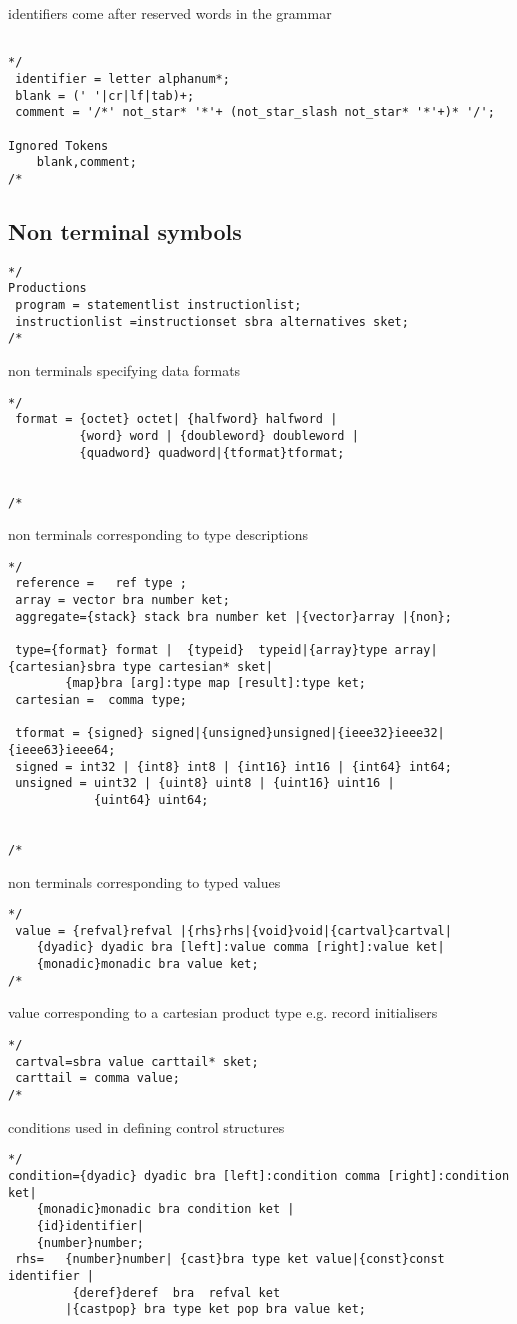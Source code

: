  identifiers come after reserved words in the grammar 
\begin{verbatim}

*/
 identifier = letter alphanum*;  
 blank = (' '|cr|lf|tab)+;
 comment = '/*' not_star* '*'+ (not_star_slash not_star* '*'+)* '/';

Ignored Tokens 
	blank,comment;
/*\end{verbatim}\subsection{Non terminal symbols}\begin{verbatim}
*/
Productions
 program = statementlist instructionlist;
 instructionlist =instructionset sbra alternatives sket;
/*\end{verbatim} non terminals specifying data formats \begin{verbatim}*/
 format = {octet} octet| {halfword} halfword |
          {word} word | {doubleword} doubleword |
          {quadword} quadword|{tformat}tformat;
 
 
/*\end{verbatim} non terminals corresponding to type descriptions \begin{verbatim}*/
 reference =   ref type ;
 array = vector bra number ket;
 aggregate={stack} stack bra number ket |{vector}array |{non};
 
 type={format} format |  {typeid}  typeid|{array}type array|{cartesian}sbra type cartesian* sket|
		{map}bra [arg]:type map [result]:type ket;
 cartesian =  comma type;
 
 tformat = {signed} signed|{unsigned}unsigned|{ieee32}ieee32|{ieee63}ieee64;
 signed = int32 | {int8} int8 | {int16} int16 | {int64} int64;
 unsigned = uint32 | {uint8} uint8 | {uint16} uint16 | 
            {uint64} uint64;
   

/*\end{verbatim} non terminals corresponding to typed values \begin{verbatim}*/
 value = {refval}refval |{rhs}rhs|{void}void|{cartval}cartval|
	{dyadic} dyadic bra [left]:value comma [right]:value ket|
	{monadic}monadic bra value ket;
/*\end{verbatim} value corresponding to a cartesian product type e.g. record initialisers \begin{verbatim}*/
 cartval=sbra value carttail* sket;
 carttail = comma value;
/*\end{verbatim} conditions used in defining control structures \begin{verbatim}*/
condition={dyadic} dyadic bra [left]:condition comma [right]:condition ket|
	{monadic}monadic bra condition ket |
	{id}identifier|
	{number}number;
 rhs=	{number}number| {cast}bra type ket value|{const}const identifier |
         {deref}deref  bra  refval ket
        |{castpop} bra type ket pop bra value ket;
 

\end{verbatim}
